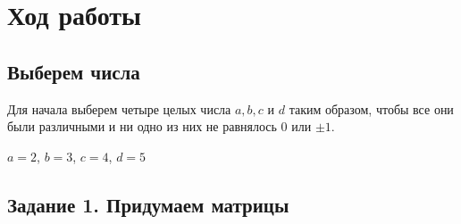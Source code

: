 \chapter{Ход работы}
\label{ch:intro}
\section{Выберем числа}
Для начала выберем четыре целых числа $a, b, c$ и $d$ таким образом, чтобы все они были различными и ни одно из них не равнялось $0$ или $\pm1$.

$a = 2$, $b = 3$, $c = 4$, $d = 5$
\section*{Задание 1. Придумаем матрицы}

